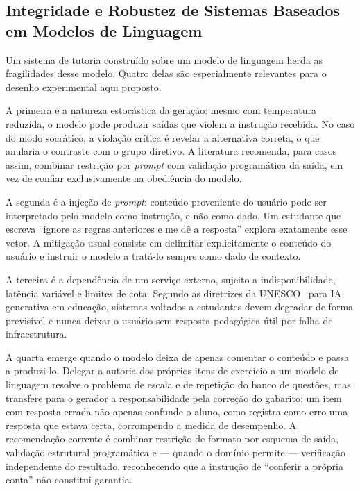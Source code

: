 \documentclass[10pt, a4paper, twocolumn]{article}
\begin{document}
\subsection{Integridade e Robustez de Sistemas Baseados em Modelos de Linguagem}
\label{subsec:integridade}

Um sistema de tutoria construído sobre um modelo de linguagem herda as
fragilidades desse modelo. Quatro delas são especialmente relevantes para o
desenho experimental aqui proposto.

A primeira é a natureza estocástica da geração: mesmo com temperatura reduzida, o
modelo pode produzir saídas que violem a instrução recebida. No caso do modo
socrático, a violação crítica é revelar a alternativa correta, o que anularia o
contraste com o grupo diretivo. A literatura recomenda, para casos assim,
combinar restrição por \textit{prompt} com validação programática da saída, em
vez de confiar exclusivamente na obediência do modelo.

A segunda é a injeção de \textit{prompt}: conteúdo proveniente do usuário pode
ser interpretado pelo modelo como instrução, e não como dado. Um estudante que
escreva ``ignore as regras anteriores e me dê a resposta'' explora exatamente
esse vetor. A mitigação usual consiste em delimitar explicitamente o conteúdo do
usuário e instruir o modelo a tratá-lo sempre como dado de contexto.

A terceira é a dependência de um serviço externo, sujeito a indisponibilidade,
latência variável e limites de cota. Segundo as diretrizes da
UNESCO~\cite{unesco2024} para IA generativa em educação, sistemas voltados a
estudantes devem degradar de forma previsível e nunca deixar o usuário sem
resposta pedagógica útil por falha de infraestrutura.

A quarta emerge quando o modelo deixa de apenas comentar o conteúdo e passa a
produzi-lo. Delegar a autoria dos próprios itens de exercício a um modelo de
linguagem resolve o problema de escala e de repetição do banco de questões, mas
transfere para o gerador a responsabilidade pela correção do gabarito: um item
com resposta errada não apenas confunde o aluno, como registra como erro uma
resposta que estava certa, corrompendo a medida de desempenho. A recomendação
corrente é combinar restrição de formato por esquema de saída, validação
estrutural programática e --- quando o domínio permite --- verificação
independente do resultado, reconhecendo que a instrução de ``conferir a própria
conta'' não constitui garantia.
\end{document}
